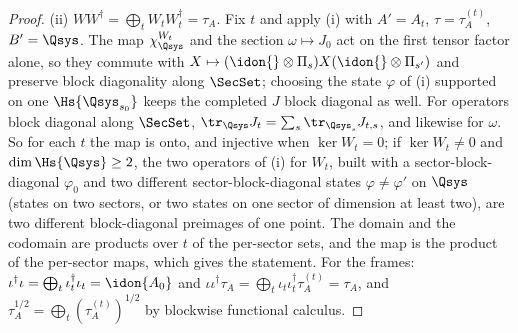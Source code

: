 \begin{proof}
(ii) $WW^{\dagger}=\bigoplus_tW_tW_t^{\dagger}=\tau_A$. Fix $t$ and apply (i)
with $A'=A_t$, $\tau=\tau^{(t)}_A$, $B'=\Qsys$. The map $\chi^{W_t}_{\Qsys}$
and the section $\omega\mapsto J_0$ act on the first tensor factor alone, so
they commute with $X\mapsto(\idon{}\otimes\Pi_s)X(\idon{}\otimes\Pi_{s'})$
and preserve block diagonality along $\SecSet$; choosing the state $\varphi$
of (i) supported on one $\Hs{\Qsys_{s_0}}$ keeps the completed $J$ block
diagonal as well. For operators block diagonal along $\SecSet$,
$\tr_{\Qsys}J_t=\sum_s\tr_{\Qsys_s}J_{t,s}$, and likewise for $\omega$. So
for each $t$ the map is onto, and injective when $\ker W_t=0$; if
$\ker W_t\ne0$ and $\dim\Hs{\Qsys}\ge2$, the two operators of (i) for
$W_t$, built with a sector-block-diagonal $\varphi_0$ and two different
sector-block-diagonal states $\varphi\ne\varphi'$ on $\Qsys$ (states on two
sectors, or two states on one sector of dimension at least two), are two
different block-diagonal preimages of one point. The domain and the
codomain are products over $t$ of the per-sector sets, and the map is the
product of the per-sector maps, which gives the statement.
For the frames: $\iota^{\dagger}\iota=\bigoplus_t\iota_t^{\dagger}\iota_t
=\idon{A_0}$ and $\iota\iota^{\dagger}\tau_A=\bigoplus_t\iota_t
\iota_t^{\dagger}\tau^{(t)}_A=\tau_A$, and
$\tau_A^{1/2}=\bigoplus_t(\tau^{(t)}_A)^{1/2}$ by blockwise functional
calculus.


\end{proof}
